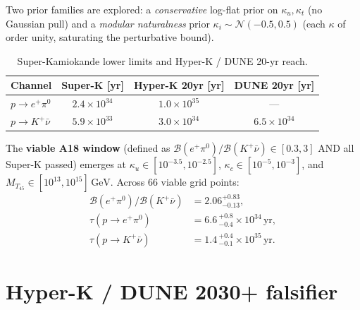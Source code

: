\documentclass[reprint,prl,nofootinbib,floatfix,linenumbers]{revtex4-2}
\newcommand{\GeV}{\,\mathrm{GeV}}
\newcommand{\yr}{\,\mathrm{yr}}
\newcommand{\MTfortyfive}{M_{T_{45}}}
\newcommand{\Br}[1]{\mathcal{B}(#1)}
\begin{document}
Two prior families are explored: a {\em conservative} log-flat prior on
$\kappa_u, \kappa_t$ (no Gaussian pull) and a {\em modular naturalness}
prior $\kappa_i\sim\mathcal N(-0.5, 0.5)$ (each $\kappa$ of order unity,
saturating the perturbative bound).

\begin{table}[t]
\centering
\caption{Super-Kamiokande lower limits and Hyper-K / DUNE 20-yr reach.\label{tab:SK}}
\begin{tabular}{lccc}
\hline\hline
Channel & Super-K [yr] & Hyper-K 20yr [yr] & DUNE 20yr [yr]\\
\hline
$p\!\to\! e^+\pi^0$ & $2.4\!\times\!10^{34}$ \cite{SuperK2020} & $1.0\!\times\!10^{35}$ \cite{HyperK2018} & --- \\
$p\!\to\! K^+\bar\nu$ & $5.9\!\times\!10^{33}$ \cite{SuperK2014} & $3.0\!\times\!10^{34}$ \cite{HyperK2018} & $6.5\!\times\!10^{34}$ \cite{Domingo2024} \\
\hline\hline
\end{tabular}
\end{table}

The {\bf viable A18 window} (defined as $\Br{e^+\pi^0}/\Br{K^+\bar\nu}\in
[0.3,3]$ AND all Super-K passed) emerges at
$\kappa_u\in[10^{-3.5},10^{-2.5}]$,
$\kappa_c\in[10^{-5},10^{-3}]$, and
$\MTfortyfive\in[10^{13},10^{15}]\GeV$. Across 66 viable grid points:
\begin{align}
\Br{e^+\pi^0}/\Br{K^+\bar\nu} &= 2.06^{+0.83}_{-0.13}, \\
\tau(p\to e^+\pi^0) &= 6.6\,_{-0.4}^{+0.8}\!\times\!10^{34}\yr,\\
\tau(p\to K^+\bar\nu) &= 1.4\,_{-0.1}^{+0.4}\!\times\!10^{35}\yr.
\end{align}

\section{Hyper-K / DUNE 2030+ falsifier}
\label{sec:falsifier}
\end{document}
